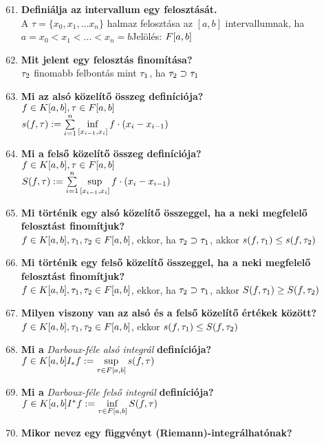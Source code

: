 \documentclass[a4paper,11pt]{article}
\begin{document}
\begin{enumerate}
	\setcounter{enumi}{60}
	\item\textbf{Definiálja az intervallum egy felosztását.}\\[0.1cm]
	A $\tau=\{x_0,x_1,...x_n\}$ halmaz felosztása az $[a,b]$
	intervallumnak, ha\\[0.2cm]$a=x_0<x_1<...<x_n=b$\hspace{2cm}Jelölés: $F[a,b]$
	\item\textbf{Mit jelent egy felosztás finomítása?}\\[0.1cm]
	$\tau_2$ finomabb felbontás mint $\tau_1$, ha $\tau_2\supset\tau_1$
	\item\textbf{Mi az alsó közelítő összeg definíciója?}\\[0.1cm]
	$f\in K[a,b],\tau\in F[a,b]$\\[0.2cm]$s(f,\tau):=\sum\limits_{i=1}^{n}
	\inf\limits_{[x_{i-1},x_i]}f\cdot(x_i-x_{i-1})$
	\item\textbf{Mi a felső közelítő összeg definíciója?}\\[0.1cm]
	$f\in K[a,b],\tau\in F[a,b]$\\[0.2cm]$S(f,\tau):=\sum\limits_{i=1}^{n}
	\sup\limits_{[x_{i-1},x_i]}f\cdot(x_i-x_{i-1})$
	\item\textbf{Mi történik egy alsó közelítő összeggel, ha a neki
	megfelelő felosztást finomítjuk?}\\[0.1cm]
	$f\in K[a,b],\tau_1,\tau_2\in F[a,b]$, ekkor,
	ha $\tau_2\supset\tau_1$, akkor $s(f,\tau_1)\leq s(f,\tau_2)$
	\item\textbf{Mi történik egy felső közelítő összeggel, ha a neki
	megfelelő felosztást finomítjuk?}\\[0.1cm]
	$f\in K[a,b],\tau_1,\tau_2\in F[a,b]$, ekkor,
	ha $\tau_2\supset\tau_1$, akkor $S(f,\tau_1)\geq S(f,\tau_2)$
	\item\textbf{Milyen viszony van az alsó és a felső közelítő értékek
	között?}\\[0.1cm]$f\in K[a,b],\tau_1,\tau_2\in F[a,b]$, ekkor $s(f,\tau_1)\leq S(f,\tau_2)$
	\item\textbf{Mi a} \textit{Darboux-féle alsó integrál}
	\textbf{definíciója?}\\[0.1cm]$f\in K[a,b]\\[0.1cm]
	I_*f:=\sup\limits_{\tau\in F[a,b]}s(f,\tau)$
	\newpage
	\item\textbf{Mi a} \textit{Darboux-féle felső integrál}
	\textbf{definíciója?}\\[0.1cm]$f\in K[a,b]\\[0.1cm]
	I^*f:=\inf\limits_{\tau\in F[a,b]}S(f,\tau)$
	\item\textbf{Mikor nevez egy függvényt (Riemann)-integrálhatónak?}\\[0.1cm]

\end{enumerate}
\end{document}
